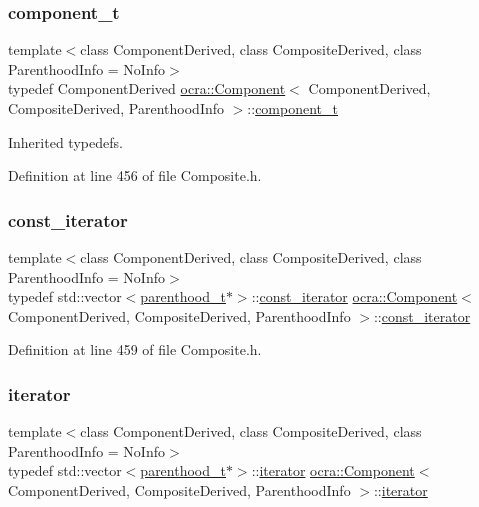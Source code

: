 \subsubsection{\texorpdfstring{component\+\_\+t}{component\_t}}
{\footnotesize\ttfamily template$<$class Component\+Derived, class Composite\+Derived, class Parenthood\+Info = No\+Info$>$ \\
typedef Component\+Derived \hyperlink{classocra_1_1Component}{ocra\+::\+Component}$<$ Component\+Derived, Composite\+Derived, Parenthood\+Info $>$\+::\hyperlink{classocra_1_1Component_aecb250aaac3aad8d82ba30303b10cf2a}{component\+\_\+t}}



Inherited typedefs. 



Definition at line 456 of file Composite.\+h.

\hypertarget{classocra_1_1Component_a6271631f04d2911e4369d1288074eebb}{}\label{classocra_1_1Component_a6271631f04d2911e4369d1288074eebb} 
\subsubsection{\texorpdfstring{const\+\_\+iterator}{const\_iterator}}
{\footnotesize\ttfamily template$<$class Component\+Derived, class Composite\+Derived, class Parenthood\+Info = No\+Info$>$ \\
typedef std\+::vector$<$\hyperlink{classocra_1_1Component_a70fb7cda78934a9f017c7e46c1407953}{parenthood\+\_\+t}$\ast$$>$\+::\hyperlink{classocra_1_1Component_a6271631f04d2911e4369d1288074eebb}{const\+\_\+iterator} \hyperlink{classocra_1_1Component}{ocra\+::\+Component}$<$ Component\+Derived, Composite\+Derived, Parenthood\+Info $>$\+::\hyperlink{classocra_1_1Component_a6271631f04d2911e4369d1288074eebb}{const\+\_\+iterator}}



Definition at line 459 of file Composite.\+h.

\hypertarget{classocra_1_1Component_a9b76b63c3248ec96dfdaca00d712c1c9}{}\label{classocra_1_1Component_a9b76b63c3248ec96dfdaca00d712c1c9} 
\subsubsection{\texorpdfstring{iterator}{iterator}}
{\footnotesize\ttfamily template$<$class Component\+Derived, class Composite\+Derived, class Parenthood\+Info = No\+Info$>$ \\
typedef std\+::vector$<$\hyperlink{classocra_1_1Component_a70fb7cda78934a9f017c7e46c1407953}{parenthood\+\_\+t}$\ast$$>$\+::\hyperlink{classocra_1_1Component_a9b76b63c3248ec96dfdaca00d712c1c9}{iterator} \hyperlink{classocra_1_1Component}{ocra\+::\+Component}$<$ Component\+Derived, Composite\+Derived, Parenthood\+Info $>$\+::\hyperlink{classocra_1_1Component_a9b76b63c3248ec96dfdaca00d712c1c9}{iterator}}



